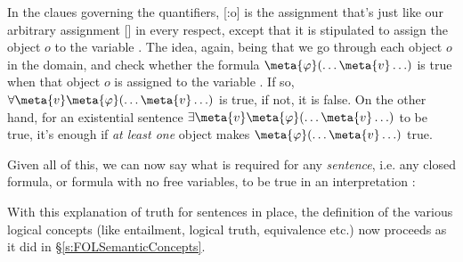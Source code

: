 In the claues governing the quantifiers, [:o] is the assignment that's just like our arbitrary assignment [] in every respect, except that it is stipulated to assign the object $o$ to the variable .  The idea, again, being that we go through each object $o$ in the domain, and check whether the formula $\meta{\varphi}(\ldots \meta{v} \ldots)$ is true when that object $o$ is assigned to the variable .  If so, $\forall \meta{v}\meta{\varphi}(\ldots \meta{v} \ldots)$ is true, if not, it is false.  On the other hand, for an existential sentence $\exists \meta{v}\meta{\varphi}(\ldots \meta{v} \ldots)$ to be true, it's enough if \emph{at least one} object makes $\meta{\varphi}(\ldots \meta{v} \ldots)$ true.

Given all of this, we can now say what is required for any \emph{sentence}, i.e. any closed formula, or formula with no free variables, to be true in an interpretation :

With this explanation of truth for sentences in place, the definition of the various logical concepts (like entailment, logical truth, equivalence etc.) now proceeds as it did in \S\ref{s:FOLSemanticConcepts}.